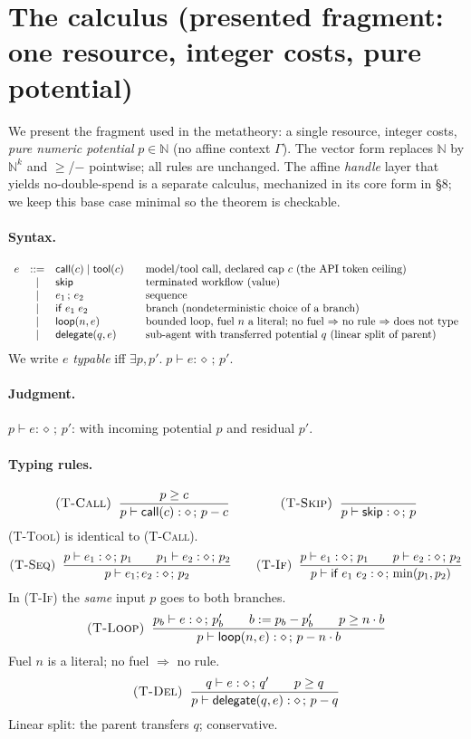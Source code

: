 \documentclass[11pt]{article}
\theoremstyle{plain}
\newcommand{\kw}[1]{\mathsf{#1}}                      %
\newcommand{\J}[3]{#1 \vdash #2 : \diamond\,;\,#3}    %
\newcommand{\rul}[1]{\textsc{(#1)}}
\begin{document}
\section{The calculus (presented fragment: one resource, integer costs, pure potential)}

We present the fragment used in the metatheory: a single resource, integer costs, \emph{pure
numeric potential} $p \in \mathbb{N}$ (no affine context $\Gamma$). The vector form replaces
$\mathbb{N}$ by $\mathbb{N}^k$ and $\ge$/$-$ pointwise; all rules are unchanged. The affine
\emph{handle} layer that yields no-double-spend is a separate calculus, mechanized in its core form
in \S8; we keep this base case minimal so the theorem is checkable.

\paragraph{Syntax.}
\[
\begin{array}{rcl@{\qquad}l}
e & ::= & \kw{call}(c) \mid \kw{tool}(c) & \text{model/tool call, declared cap $c$ (the API token ceiling)} \\
  & \mid & \kw{skip}                      & \text{terminated workflow (value)} \\
  & \mid & e_1 \,;\, e_2                  & \text{sequence} \\
  & \mid & \kw{if}\; e_1\; e_2            & \text{branch (nondeterministic choice of a branch)} \\
  & \mid & \kw{loop}(n, e)                & \text{bounded loop, fuel $n$ a literal; no fuel $\Rightarrow$ no rule $\Rightarrow$ does not type} \\
  & \mid & \kw{delegate}(q, e)            & \text{sub-agent with transferred potential $q$ (linear split of parent)}
\end{array}
\]
We write $e$ \emph{typable} iff $\exists p, p'.\;\J{p}{e}{p'}$.

\paragraph{Judgment.}
$\J{p}{e}{p'}$: with incoming potential $p$ and residual $p'$.

\paragraph{Typing rules.}
\[
\rul{T-Call}\;\; \frac{p \ge c}{\J{p}{\kw{call}(c)}{p - c}}
\qquad\qquad
\rul{T-Skip}\;\; \frac{}{\J{p}{\kw{skip}}{p}}
\]
\noindent\rul{T-Tool} is identical to \rul{T-Call}.
\[
\rul{T-Seq}\;\; \frac{\J{p}{e_1}{p_1} \qquad \J{p_1}{e_2}{p_2}}{\J{p}{e_1 ; e_2}{p_2}}
\qquad
\rul{T-If}\;\; \frac{\J{p}{e_1}{p_1} \qquad \J{p}{e_2}{p_2}}{\J{p}{\kw{if}\; e_1\; e_2}{\min(p_1, p_2)}}
\]
\noindent In \rul{T-If} the \emph{same} input $p$ goes to both branches.
\[
\rul{T-Loop}\;\; \frac{\J{p_b}{e}{p_b'} \qquad b := p_b - p_b' \qquad p \ge n \cdot b}{\J{p}{\kw{loop}(n, e)}{p - n \cdot b}}
\]
\noindent Fuel $n$ is a literal; no fuel $\Rightarrow$ no rule.
\[
\rul{T-Del}\;\; \frac{\J{q}{e}{q'} \qquad p \ge q}{\J{p}{\kw{delegate}(q, e)}{p - q}}
\]
\noindent Linear split: the parent transfers $q$; conservative.
\end{document}
